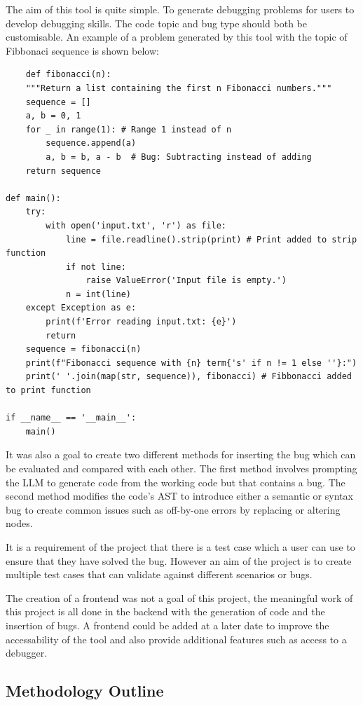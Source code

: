 \documentclass[12pt]{extarticle}
\begin{document}
The aim of this tool is quite simple. To generate debugging problems for users to develop debugging skills. The code topic and bug type should both be customisable. An example of a problem generated by this tool with the topic of Fibbonaci sequence is shown below:
\begin{lstlisting}
    def fibonacci(n):
    """Return a list containing the first n Fibonacci numbers."""
    sequence = []
    a, b = 0, 1
    for _ in range(1): # Range 1 instead of n
        sequence.append(a)
        a, b = b, a - b  # Bug: Subtracting instead of adding   
    return sequence

def main():
    try:
        with open('input.txt', 'r') as file:
            line = file.readline().strip(print) # Print added to strip function
            if not line:
                raise ValueError('Input file is empty.')
            n = int(line)
    except Exception as e:
        print(f'Error reading input.txt: {e}')
        return
    sequence = fibonacci(n)
    print(f"Fibonacci sequence with {n} term{'s' if n != 1 else ''}:")
    print(' '.join(map(str, sequence)), fibonacci) # Fibbonacci added to print function

if __name__ == '__main__':
    main()
\end{lstlisting}
It was also a goal to create two different methods for inserting the bug which can be evaluated and compared with each other. The first method involves prompting the LLM to generate code from the working code but that contains a bug. The second method modifies the code's AST to introduce either a semantic or syntax bug to create common issues such as off-by-one errors by replacing or altering nodes.

It is a requirement of the project that there is a test case which a user can use to ensure that they have solved the bug. However an aim of the project is to create multiple test cases that can validate against different scenarios or bugs.

The creation of a frontend was not a goal of this project, the meaningful work of this project is all done in the backend with the generation of code and the insertion of bugs. A frontend could be added at a later date to improve the accessability of the tool and also provide additional features such as access to a debugger.

\subsection{Methodology Outline}
\end{document}
